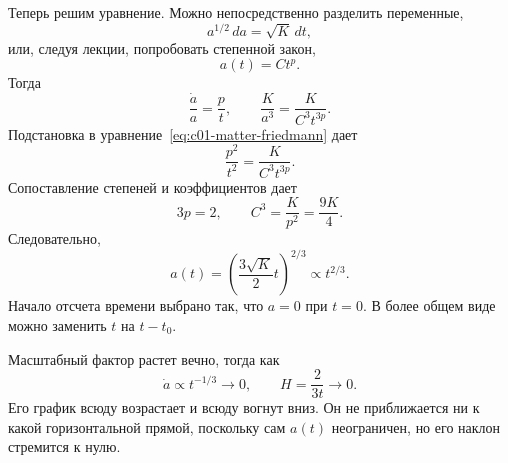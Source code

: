 Теперь решим уравнение. Можно непосредственно разделить переменные,
\begin{equation}
a^{1/2}\,da=\sqrt{K}\,dt,
\end{equation}
или, следуя лекции, попробовать степенной закон,
\begin{equation}
a(t)=Ct^p.
\label{eq:c01-power-trial}
\end{equation}
Тогда
\begin{equation}
\frac{\dot a}{a}=\frac{p}{t},
\qquad
\frac{K}{a^3}=\frac{K}{C^3t^{3p}}.
\end{equation}
Подстановка в уравнение~\eqref{eq:c01-matter-friedmann} дает
\begin{equation}
\frac{p^2}{t^2}=\frac{K}{C^3t^{3p}}.
\end{equation}
Сопоставление степеней и коэффициентов дает
\begin{equation}
3p=2,
\qquad
C^3=\frac{K}{p^2}=\frac{9K}{4}.
\end{equation}
Следовательно,
\begin{equation}
\boxed{
a(t)=\left(\frac{3\sqrt K}{2}t\right)^{2/3}\propto t^{2/3}.
}
\label{eq:c01-two-thirds}
\end{equation}
Начало отсчета времени выбрано так, что \(a=0\) при \(t=0\). В более общем виде можно заменить \(t\) на \(t-t_0\).

Масштабный фактор растет вечно, тогда как
\begin{equation}
\dot a\propto t^{-1/3}\longrightarrow0,
\qquad
H=\frac{2}{3t}\longrightarrow0.
\label{eq:c01-asymptotic-slope}
\end{equation}
Его график всюду возрастает и всюду вогнут вниз. Он не приближается ни к какой горизонтальной прямой, поскольку сам \(a(t)\) неограничен, но его наклон стремится к нулю.

\begin{classroomqa}
\end{classroomqa}

